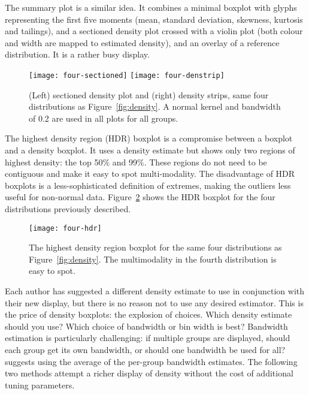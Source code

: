 \documentclass[oneside]{article}
\begin{document}
The summary plot \citep{potter:2010} is a similar idea. It combines a minimal boxplot with glyphs representing the first five moments (mean, standard deviation, skewness, kurtosis and tailings), and a sectioned density plot crossed with a violin plot (both colour and width are mapped to estimated density), and an overlay of a reference distribution. It is a rather busy display.

\begin{figure}[htbp]
  \centering
  \texttt{[image: four-sectioned]}%
  \texttt{[image: four-denstrip]}
  \caption{(Left) sectioned density plot and (right) density strips, same four distributions as Figure~\ref{fig:density}. A normal kernel and bandwidth of 0.2 are used in all plots for all groups.}
  \label{fig:density-display}
\end{figure}

The highest density region (HDR) boxplot \citep{hyndman:1996a} is a compromise between a boxplot and a density boxplot. It uses a density estimate but shows only two regions of highest density: the top 50\% and 99\%. These regions do not need to be contiguous and make it easy to spot multi-modality. The disadvantage of HDR boxplots is a less-sophisticated definition of extremes, making the outliers less useful for non-normal data. Figure~\ref{fig:hdr} shows the HDR boxplot for the four distributions previously described.

\begin{figure}[htbp]
  \centering
    \texttt{[image: four-hdr]}%
  \caption{The highest density region boxplot for the same four distributions as Figure~\ref{fig:density}. The multimodality in the fourth distribution is easy to spot.}
  \label{fig:hdr}
\end{figure}

Each author has suggested a different density estimate to use in conjunction with their new display, but there is no reason not to use any desired estimator. This is the price of density boxplots: the explosion of choices. Which density estimate should you use? Which choice of bandwidth or bin width is best? Bandwidth estimation is particularly challenging: if multiple groups are displayed, should each group get its own bandwidth, or should one bandwidth be used for all? \citet{kampstra:2008} suggests using the average of the per-group bandwidth estimates. The following two methods attempt a richer display of density without the cost of additional tuning parameters.
\end{document}
